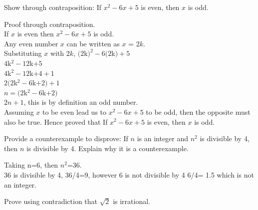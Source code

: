 \documentclass[a4paper]{exam}
\theoremstyle{definition}
\begin{document}
\begin{questions}
  
\question
  Show through contraposition: If $x^2 - 6x + 5$ is even, then $x$ is odd.
  \begin{solution}
   
    Proof through contraposition.\\
    If $x$ is even then $x^2 - 6x + 5$ is odd.\\
    Any even number $x$ can be written as $x$ = 2$k$.\\
    Substituting $x$ with 2$k$,  $(2$k$)^2 - 6(2$k$) + 5$\\
     $4$k$^2 - 12$k$ + 5$\\
     $4$k$^2 - 12$k$ + 4 +1$\\
     $ 2(2$k$^2 - 6$k$ + 2) +1$\\
     $n=(2$k$^2 - 6$k$ + 2) $\\
     $ 2n +1$, this is by definition an odd number.\\
     Assuming $x$ to be even lead us to $x^2 - 6x + 5$ to be odd, then the opposite must also be true. Hence proved that If $x^2 - 6x + 5$ is even, then $x$ is odd.
  \end{solution}

\question Provide a counterexample to disprove: If $n$ is an integer and $n^2$ is divisible by 4, then $n$ is divisible by 4. Explain why it is a counterexample.

  \begin{solution}
   
    Taking n=6, then $n^2$=36.\\
    36 is divisible by 4, 36/4=9, however 6 is not divisible by 4 6/4= 1.5 which is not an integer. 
  \end{solution}
  
\question Prove using contradiction that $\sqrt{2}$ is irrational.

  \begin{solution}
   

\end{solution}
\end{questions}
\end{document}
